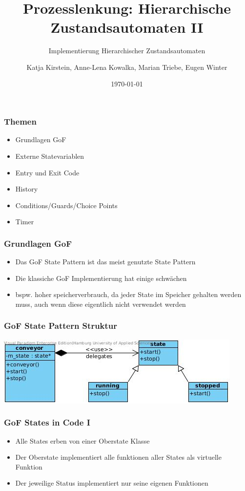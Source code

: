 \documentclass{beamer}
\title{Prozesslenkung: Hierarchische Zustandsautomaten II}
\subtitle{Implementierung Hierarchischer Zustandsautomaten}
\author{Katja Kirstein, Anne-Lena Kowalka, Marian Triebe, Eugen Winter}
\date{\today}
\begin{document}
\begin{frame}
\titlepage
\end{frame}

\begin{frame}
 \frametitle{Themen}
 \begin{itemize}
  \item Grundlagen GoF
  \item Externe Statevariablen
  \item Entry und Exit Code
  \item History
  \item Conditions/Guards/Choice Points
  \item Timer
 \end{itemize}
\end{frame}

\begin{frame}
 \frametitle{Grundlagen GoF}
 \begin{itemize}
  \item Das GoF State Pattern ist das meist genutzte State Pattern
  \item Die klassiche GoF Implementierung hat einige schw\"achen
  \item bspw. hoher speicherverbrauch, da jeder State im Speicher gehalten werden muss, auch wenn diese eigentlich nicht verwendet werden
 \end{itemize}
\end{frame}

\begin{frame}
 \frametitle{GoF State Pattern Struktur}
 \includegraphics[scale=.6]{fsm_gof.jpg}
\end{frame}

\begin{frame}
 \frametitle{GoF States in Code I}
 \begin{itemize}
  \item Alle States erben von einer Oberstate Klasse
  \item Der Oberstate implementiert alle funktionen aller States als virtuelle Funktion
  \item Der jeweilige Status implementiert nur seine eigenen Funktionen
 \end{itemize}
\end{frame}
\end{document}
